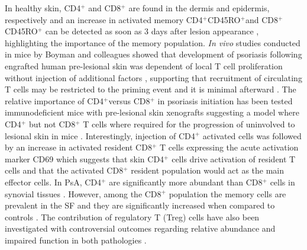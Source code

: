 In healthy skin, CD4$^{+}$ and CD8$^{+}$ are found in the dermis and epidermis, respectively \parencite{Clark2006,Perera2012} and an increase in activated memory CD4$^{+}$CD45RO$^{+}$and CD8$^{+}$CD45RO$^{+}$ can be detected as soon as 3 days after lesion appearance \parencite{Clark2006}, highlighting the importance of the memory population. \textit{In vivo} studies conducted in mice by Boyman and colleagues showed that development of psoriasis following engrafted human pre-lesional skin was dependent of local T cell proliferation without injection of additional factors \parencite{Boyle2013}, supporting that recruitment of circulating T cells may be restricted to the priming event and it is minimal afterward \parencite{Perera2012}. The relative importance of CD4$^{+}$versus CD8$^{+}$ in psoriasis initiation has been tested immunodeficient mice with pre-lesional skin xenografts suggesting a model where CD4$^{+}$ but not CD8$^{+}$ T cells where required for the progression of uninvolved to lesional skin in mice \parencite{Nickoloff1999}. Interestingly, injection of CD4$^{+}$ activated cells was followed by an increase in activated resident CD8$^{+}$ T cells expressing the acute activation marker CD69 which suggests that skin CD4$^{+}$ cells drive activation of resident T cells and that the activated CD8$^{+}$ resident population would act as the main effector cells. In PsA, CD4$^{+}$ are significantly more abundant than CD8$^{+}$ cells in synovial tissues \parencite{Diani2015}. However, among the CD8$^{+}$ population the memory cells are prevalent in the SF and they are significantly increased when compared to controls \parencite{Costello1999}. The contribution of regulatory T (Treg) cells have also been investigated with controversial outcomes regarding relative abundance and impaired function in both pathologies \parencite{Perera2012}. 

